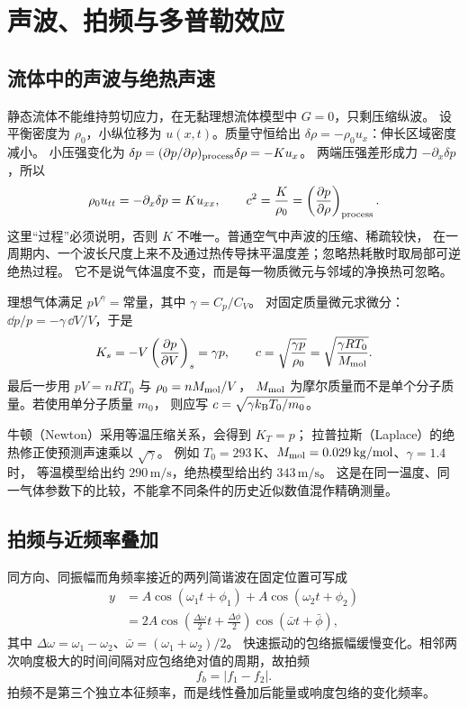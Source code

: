 \section{声波、拍频与多普勒效应}
\subsection{流体中的声波与绝热声速}

静态流体不能维持剪切应力，在无黏理想流体模型中 $G=0$，只剩压缩纵波。
设平衡密度为 $\rho_0$，小纵位移为 $u(x,t)$。质量守恒给出
$\delta\rho=-\rho_0 u_x$：伸长区域密度减小。
小压强变化为
$\delta p=(\partial p/\partial\rho)_{\rm process}\delta\rho=-K u_x$。
两端压强差形成力 $-\partial_x\delta p$，所以
\[
 \rho_0u_{tt}=-\partial_x\delta p=K u_{xx},\qquad
 c^2=\frac K{\rho_0}=\left(\frac{\partial p}{\partial\rho}\right)_{\rm process}.
\]
这里“过程”必须说明，否则 $K$ 不唯一。普通空气中声波的压缩、稀疏较快，
在一周期内、一个波长尺度上来不及通过热传导抹平温度差；忽略热耗散时取局部可逆绝热过程。
它不是说气体温度不变，而是每一物质微元与邻域的净换热可忽略。

理想气体满足 $pV^\gamma=\text{常量}$，其中 $\gamma=C_p/C_V$。
对固定质量微元求微分：
$\dd p/p=-\gamma\,\dd V/V$，于是
\begin{equation}
 K_s=-V\left(\frac{\partial p}{\partial V}\right)_s=\gamma p,\qquad
 c=\sqrt{\frac{\gamma p}{\rho_0}}
  =\sqrt{\frac{\gamma RT_0}{M_{\rm mol}}}.
 \label{ch12:eq:sound-speed}
\end{equation}
最后一步用 $pV=nRT_0$ 与 $\rho_0=nM_{\rm mol}/V$，
$M_{\rm mol}$ 为摩尔质量而不是单个分子质量。若使用单分子质量 $m_0$，
则应写 $c=\sqrt{\gamma k_{\rm B}T_0/m_0}$。

牛顿（Newton）采用等温压缩关系，会得到 $K_T=p$；
拉普拉斯（Laplace）的绝热修正使预测声速乘以 $\sqrt\gamma$。
例如 $T_0=293\,\mathrm K$、$M_{\rm mol}=0.029\,\mathrm{kg/mol}$、$\gamma=1.4$ 时，
等温模型给出约 $290\,\mathrm{m/s}$，绝热模型给出约 $343\,\mathrm{m/s}$。
这是在同一温度、同一气体参数下的比较，不能拿不同条件的历史近似数值混作精确测量。



\subsection{拍频与近频率叠加}

同方向、同振幅而角频率接近的两列简谐波在固定位置可写成
\begin{align}
 y&=A\cos(\omega_1t+\phi_1)+A\cos(\omega_2t+\phi_2)\\
 &=2A\cos\!\left(\frac{\Delta\omega}{2}t+\frac{\Delta\phi}{2}\right)
 \cos\!\left(\bar\omega t+\bar\phi\right),
\end{align}
其中 $\Delta\omega=\omega_1-\omega_2$、$\bar\omega=(\omega_1+\omega_2)/2$。
快速振动的包络振幅缓慢变化。相邻两次响度极大的时间间隔对应包络绝对值的周期，故拍频
\begin{equation}
 f_b=|f_1-f_2|.
\end{equation}
拍频不是第三个独立本征频率，而是线性叠加后能量或响度包络的变化频率。

